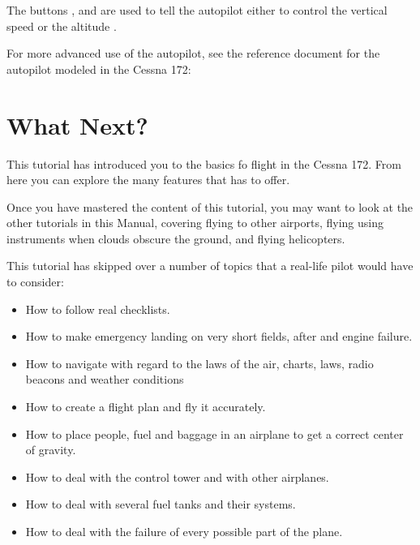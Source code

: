 The buttons ,  and  are used to tell
the autopilot either to control the vertical
speed
\textcolor{orange}{} or the altitude
\textcolor{orange}{}.
    
For more advanced use of the autopilot, see the reference document for the
autopilot modeled in the Cessna 172: 

    
\section{What Next?}
\label{sec:Poslowie}

This tutorial has introduced you to the basics fo flight in the Cessna 172. From
here you can explore the many features that \FlightGear{} has to offer.

Once you have mastered the content of this tutorial, you may want to look at the
other tutorials in this Manual, covering flying to other airports, flying using
instruments when clouds obscure the ground, and flying helicopters.

This tutorial has skipped over a number of topics that a real-life pilot would
have to consider:
\begin{itemize}
	\item How to follow real checklists.
	\item How to make emergency landing on very short fields, after and engine
  failure.
	\item How to navigate with regard to the laws of the air, charts, laws, radio 
  beacons and weather conditions
	\item How to create a flight plan and fly it accurately.
	\item How to place people, fuel and baggage in an airplane to get a correct 
  center of gravity.
	\item How to deal with the control tower and with other airplanes.
	\item How to deal with several fuel tanks and their systems.  
	\item How to deal with the failure of every possible part of the plane. 
\end{itemize}

